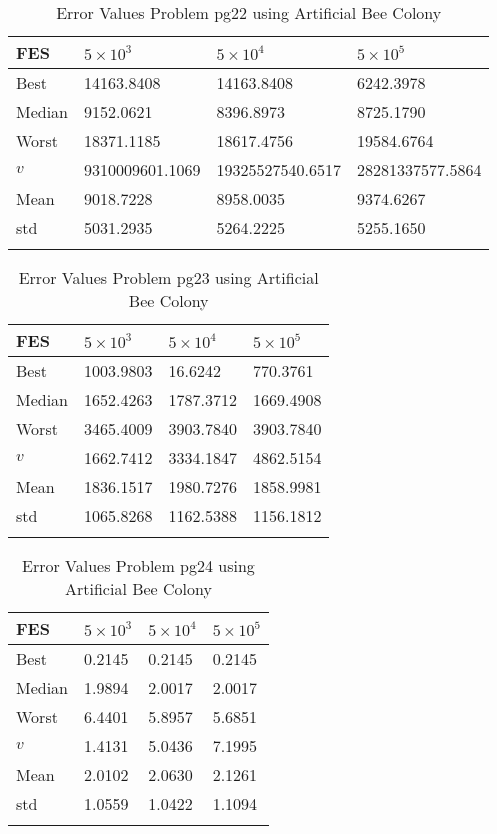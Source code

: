 \documentclass[10pt, a4paper]{book}
\begin{document}
\begin{center}
\begin{longtable}{l l l l}
FES & $5 \times 10^{3}$ & $5 \times 10^{4}$ & $5 \times 10^{5}$ \\
\hline
Best & 14163.8408 & 14163.8408 & 6242.3978 \\
Median & 9152.0621 & 8396.8973 & 8725.1790 \\
Worst & 18371.1185 & 18617.4756 & 19584.6764 \\
$v$ & 9310009601.1069 & 19325527540.6517 & 28281337577.5864 \\
Mean & 9018.7228 & 8958.0035 & 9374.6267 \\
std & 5031.2935 & 5264.2225 & 5255.1650 \\
\caption{ Error Values Problem pg22 using Artificial Bee Colony }
\end{longtable}
\end{center}

\begin{center}
\begin{longtable}{l l l l}
FES & $5 \times 10^{3}$ & $5 \times 10^{4}$ & $5 \times 10^{5}$ \\
\hline
Best & 1003.9803 & 16.6242 & 770.3761 \\
Median & 1652.4263 & 1787.3712 & 1669.4908 \\
Worst & 3465.4009 & 3903.7840 & 3903.7840 \\
$v$ & 1662.7412 & 3334.1847 & 4862.5154 \\
Mean & 1836.1517 & 1980.7276 & 1858.9981 \\
std & 1065.8268 & 1162.5388 & 1156.1812 \\
\caption{ Error Values Problem pg23 using Artificial Bee Colony }
\end{longtable}
\end{center}

\begin{center}
\begin{longtable}{l l l l}
FES & $5 \times 10^{3}$ & $5 \times 10^{4}$ & $5 \times 10^{5}$ \\
\hline
Best & 0.2145 & 0.2145 & 0.2145 \\
Median & 1.9894 & 2.0017 & 2.0017 \\
Worst & 6.4401 & 5.8957 & 5.6851 \\
$v$ & 1.4131 & 5.0436 & 7.1995 \\
Mean & 2.0102 & 2.0630 & 2.1261 \\
std & 1.0559 & 1.0422 & 1.1094 \\
\caption{ Error Values Problem pg24 using Artificial Bee Colony }
\end{longtable}
\end{center}
\end{document}
